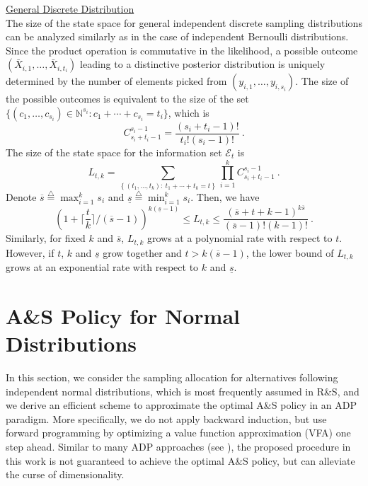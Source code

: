 \documentclass[journal]{IEEEtran}
\newcommand{\ed}{\stackrel{\triangle}{=}}
\begin{document}
  \noindent\underline{General Discrete Distribution}\\
  
 The size of the state space for general independent discrete sampling distributions can be analyzed similarly as in  the case of independent Bernoulli distributions.  Since the product operation is commutative in the likelihood, a possible outcome  $(\bar{X}_{i,1},\ldots,\bar{X}_{i,t_i})$ leading to a distinctive posterior distribution is uniquely determined by the number of elements picked from $(y_{i,1},\ldots,y_{i,s_i})$. The size of the possible outcomes is equivalent to the size of the set $\{ (c_1,\ldots,c_{s_i})\in\mathbb{N}^{s_i}: c_1+\cdots+ c_{s_i}=t_i \}$, which is 
 $$C_{s_i+t_i-1}^{s_i-1}=\frac{(s_i+t_i-1)!}{t_i!(s_i-1)!}~.$$
 The size of the state space for the information set  $\mathcal{E}_t$ is 
 $$L_{t,k}=\sum_{\left\{(t_1,\ldots,t_k):~t_1+\cdots+t_k=t\right\}}\prod_{i=1}^{k}C_{s_i+t_i-1}^{s_i-1}~.$$
 Denote $\overline{s}\ed\max_{i=1}^k s_i$ and $\underline{s}\ed\min_{i=1}^k s_i$. Then, we have 
 $$ \left(1+\lceil\frac{t}{k}\rceil/(\overline{s}-1)\right)^{k(\underline{s}-1)}\leq L_{t,k}\leq \frac{(\overline{s}+t+k-1)^{k\overline{s}}}{(\overline{s}-1)!(k-1)!}~.$$
 Similarly, for fixed $k$ and $\overline{s}$, $L_{t,k}$ grows at a polynomial rate with respect to $t$. However, if $t$, $k$ and $\underline{s}$  grow together and $t>k(\overline{s}-1)$, the lower bound of $L_{t,k}$ grows at an exponential rate with respect to $k$ and $\underline{s}$.
 \section{A\&S Policy for Normal Distributions}\label{asn}
 In this section, we consider the sampling allocation for alternatives following independent normal distributions, which is most frequently assumed in  R\&S, and we derive an efficient scheme to approximate the optimal A\&S policy in an ADP paradigm. More specifically, we do not apply backward induction, but use forward programming by optimizing a value function approximation (VFA) one step ahead. Similar to many ADP approaches  (see \cite{powell2007approximate}), the proposed procedure in this work is not guaranteed to achieve the optimal A\&S policy, but can alleviate the curse of dimensionality.    
\end{document}
